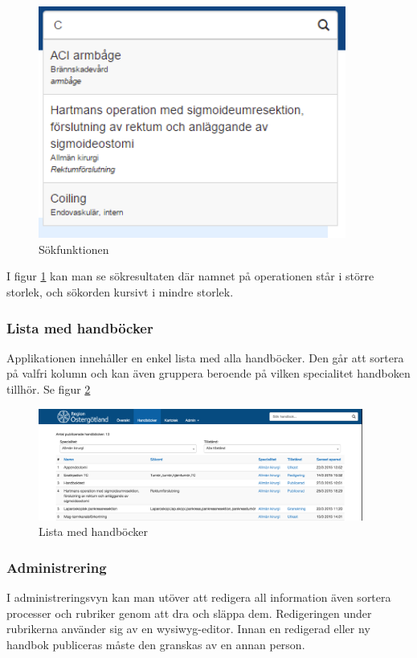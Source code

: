 \begin{figure}
  \centering
  \includegraphics[width=0.9\textwidth]{images/site/search}
  \caption{Sökfunktionen}
  \label{fig:search}
\end{figure}

I figur \ref{fig:search} kan man se sökresultaten där namnet på operationen står i större storlek, och sökorden kursivt i mindre storlek.

\subsubsection{Lista med handböcker}
Applikationen innehåller en enkel lista med alla handböcker.
Den går att sortera på valfri kolumn och kan även gruppera beroende på vilken specialitet handboken tillhör.
Se figur \ref{fig:list}

\begin{figure}
  \centering
  \includegraphics[width=0.95\textwidth]{images/site/list}
  \caption{Lista med handböcker}
  \label{fig:list}
\end{figure}

\subsubsection{Administrering}
I administreringsvyn kan man utöver att redigera all information även sortera processer och rubriker genom att dra och släppa dem.
Redigeringen under rubrikerna använder sig av en wysiwyg-editor.
Innan en redigerad eller ny handbok publiceras måste den granskas av en annan person.

